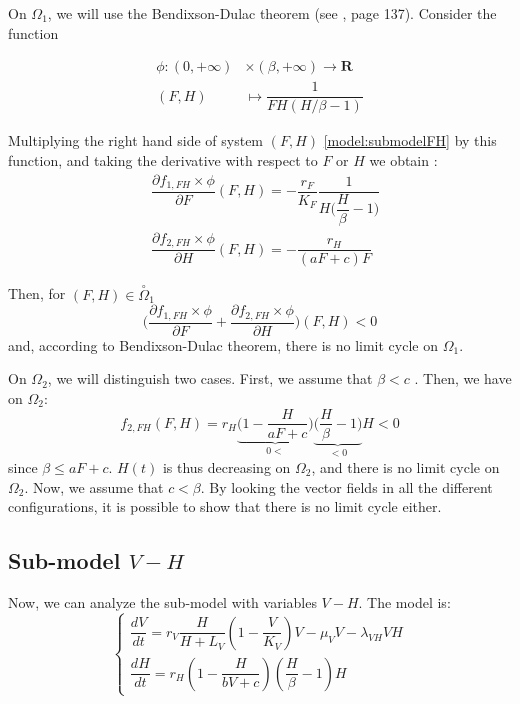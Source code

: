 \documentclass{article}
\newcommand{\lv}{\lambda_{VH}}
\begin{document}
On $\Omega_1$, we will use the Bendixson-Dulac theorem (see \cite{farkas_1994_periodic}, page 137). Consider the function

\begin{align}
\phi : (0, +\infty) &\times (\beta, +\infty) \rightarrow \mathbf{R} \label{limit cylce:phiFH}
\\
\nonumber
(F,H) & \mapsto \dfrac{1}{F H (H/\beta - 1)}
\end{align}

Multiplying the right hand side of system $(F,H)$ \eqref{model:submodelFH} by this function, and taking the derivative with respect to $F$ or $H$ we obtain :
\begin{subequations}
\begin{align}
&\dfrac{\partial f_{1,FH} \times \phi}{\partial F}(F,H) = - \dfrac{r_F}{K_F} \dfrac{1}{H \big(\dfrac{H}{\beta}-1 \big)} \\
&\dfrac{\partial f_{2,FH} \times \phi}{\partial H}(F,H) = - \dfrac{r_H}{(aF + c) F}
\end{align}
\end{subequations}

Then, for $(F, H) \in \overset{\circ}{\Omega}_1$
\begin{equation}
\Big(\dfrac{\partial f_{1,FH} \times \phi}{\partial F} + \dfrac{\partial f_{2,FH} \times \phi}{\partial H}\Big) (F, H) < 0
\end{equation}
and, according to Bendixson-Dulac theorem, there is no limit cycle on $\Omega_1$.

On $\Omega_2$, we will distinguish two cases. First, we assume that $\beta < c$ . Then, we have on $\Omega_2$:
\begin{equation}
f_{2,FH}(F,H) = r_H \underset{0<}{\underbrace{\Big(1 - \dfrac{H}{aF + c} \Big)}}\underset{<0}{\underbrace{\Big(\dfrac{H}{\beta} -1\Big)}} H < 0
\end{equation}
since $\beta \leq aF + c$. $H(t)$ is thus decreasing on $\Omega_2$, and there is no limit cycle on $\Omega_2$.
Now, we assume that $c < \beta$. By looking the vector fields in all the different configurations, it is possible to show that there is no limit cycle either.

\subsection{Sub-model $V-H$}
Now, we can analyze the sub-model with variables $V-H$. The model is:
\begin{equation}    
\left\{ \begin{array}{l}
\dfrac{dV}{dt}=r_V \dfrac{H}{H + L_V} \left(1-\dfrac{V}{K_{V}}\right)V -\mu_V V -\lv V H\\
\dfrac{dH}{dt}=r_H \left(1-\dfrac{H}{bV + c} \right)  (\dfrac{H}{\beta} - 1) H
\end{array}\right.
\label{model:submodelVH}
\end{equation}
\end{document}
